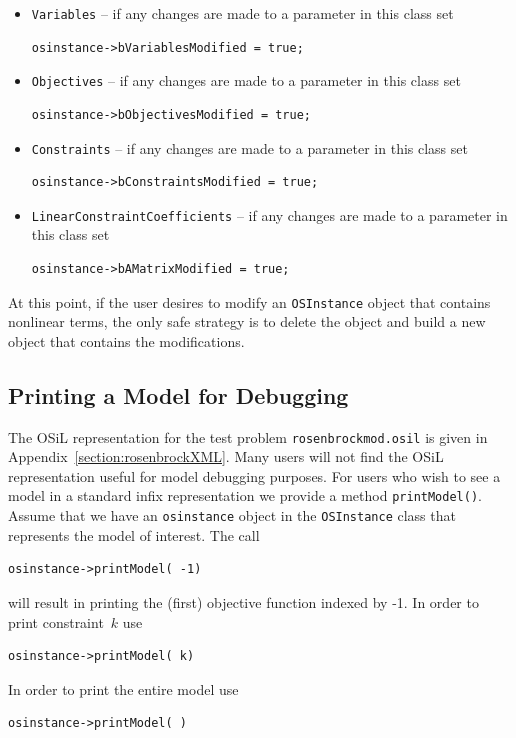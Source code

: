 \documentclass[11pt]{article}
\renewcommand{\_}{{\char"5F}}
\renewcommand{\{}{{\char"7B}}
\renewcommand{\}}{{\char"7D}}
\renewcommand{\^}{{\char"0D}}
\renewcommand{\'}{{\char"0D}}
\begin{document}
\begin{enumerate}[Step 1:]
\begin{itemize}
\item {\tt Variables} -- if any changes are made to a parameter in this class set

\begin{verbatim}
osinstance->bVariablesModified = true;
\end{verbatim}

\item {\tt Objectives} -- if any changes are made to a parameter in this class set

\begin{verbatim}
osinstance->bObjectivesModified = true;
\end{verbatim}

\item {\tt Constraints} -- if any changes are made to a parameter in this class set

\begin{verbatim}
osinstance->bConstraintsModified = true;
\end{verbatim}

\item {\tt LinearConstraintCoefficients} -- if any changes are made to a parameter in this class set

\begin{verbatim}
osinstance->bAMatrixModified = true;
\end{verbatim}
\end{itemize}

At this point, if the user desires to modify an {\tt OSInstance} object that contains nonlinear terms, 
the only safe strategy is to delete the object and build a new object that contains the modifications. 



\subsection{Printing a Model for Debugging}\label{section:printModel}

The OSiL representation for the test problem {\tt rosenbrockmod.osil} is given in 
Appendix~\ref{section:rosenbrockXML}.  Many users will not find the OSiL representation 
useful for model debugging purposes.  For users who wish to see a model in a standard infix 
representation we provide a method {\tt printModel()}.  Assume that we have an {\tt osinstance} 
object in the {\tt OSInstance} class that represents the model of interest.  The call
\begin{verbatim}
osinstance->printModel( -1)
\end{verbatim}
will result in printing the (first) objective function indexed by -1.  In order to print 
constraint~$k$ use
\begin{verbatim}
osinstance->printModel( k)
\end{verbatim}
In order to print the entire model use
\begin{verbatim}
osinstance->printModel( )
\end{verbatim}


\end{enumerate}
\end{document}
